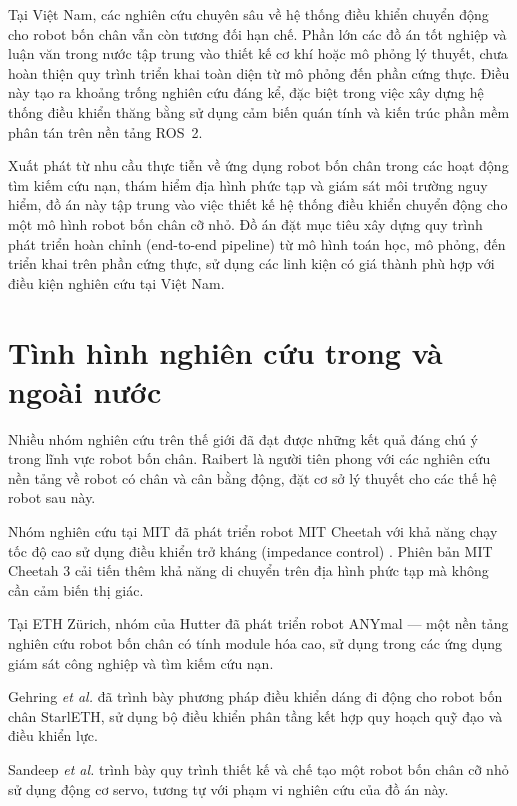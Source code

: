 Tại Việt Nam, các nghiên cứu chuyên sâu về hệ thống điều khiển chuyển động cho robot bốn chân vẫn còn tương đối hạn chế. Phần lớn các đồ án tốt nghiệp và luận văn trong nước tập trung vào thiết kế cơ khí hoặc mô phỏng lý thuyết, chưa hoàn thiện quy trình triển khai toàn diện từ mô phỏng đến phần cứng thực. Điều này tạo ra khoảng trống nghiên cứu đáng kể, đặc biệt trong việc xây dựng hệ thống điều khiển thăng bằng sử dụng cảm biến quán tính và kiến trúc phần mềm phân tán trên nền tảng ROS~2.

Xuất phát từ nhu cầu thực tiễn về ứng dụng robot bốn chân trong các hoạt động tìm kiếm cứu nạn, thám hiểm địa hình phức tạp và giám sát môi trường nguy hiểm, đồ án này tập trung vào việc thiết kế hệ thống điều khiển chuyển động cho một mô hình robot bốn chân cỡ nhỏ. Đồ án đặt mục tiêu xây dựng quy trình phát triển hoàn chỉnh (end-to-end pipeline) từ mô hình toán học, mô phỏng, đến triển khai trên phần cứng thực, sử dụng các linh kiện có giá thành phù hợp với điều kiện nghiên cứu tại Việt Nam.

\section{Tình hình nghiên cứu trong và ngoài nước}

Nhiều nhóm nghiên cứu trên thế giới đã đạt được những kết quả đáng chú ý trong lĩnh vực robot bốn chân. Raibert \cite{raibert1986} là người tiên phong với các nghiên cứu nền tảng về robot có chân và cân bằng động, đặt cơ sở lý thuyết cho các thế hệ robot sau này.

Nhóm nghiên cứu tại MIT đã phát triển robot MIT Cheetah với khả năng chạy tốc độ cao sử dụng điều khiển trở kháng (impedance control) \cite{hyun2014}. Phiên bản MIT Cheetah 3 \cite{bledt2018} cải tiến thêm khả năng di chuyển trên địa hình phức tạp mà không cần cảm biến thị giác.

Tại ETH Zürich, nhóm của Hutter đã phát triển robot ANYmal \cite{hutter2016} --- một nền tảng nghiên cứu robot bốn chân có tính module hóa cao, sử dụng trong các ứng dụng giám sát công nghiệp và tìm kiếm cứu nạn.

Gehring \textit{et al.} \cite{gehring2013} đã trình bày phương pháp điều khiển dáng đi động cho robot bốn chân StarlETH, sử dụng bộ điều khiển phân tầng kết hợp quy hoạch quỹ đạo và điều khiển lực.

Sandeep \textit{et al.} \cite{sandeep2021} trình bày quy trình thiết kế và chế tạo một robot bốn chân cỡ nhỏ sử dụng động cơ servo, tương tự với phạm vi nghiên cứu của đồ án này.


